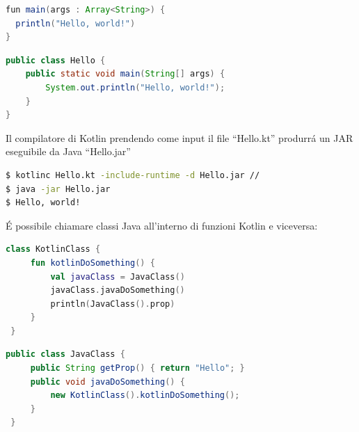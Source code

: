 \begin{lstlisting}[language=java,caption={Hello.kt in Kotlin}]
fun main(args : Array<String>) {
  println("Hello, world!")
}
\end{lstlisting}

\begin{lstlisting}[language=java,caption={Hello.java in Java}]
public class Hello {
    public static void main(String[] args) {
        System.out.println("Hello, world!");
    }
}
\end{lstlisting}

Il compilatore di Kotlin prendendo come input il file ``Hello.kt'' produrr\'a un JAR eseguibile da Java ``Hello.jar''

\begin{lstlisting}[language=bash,caption={Compilatore kotlin}]
$ kotlinc Hello.kt -include-runtime -d Hello.jar //
$ java -jar Hello.jar
$ Hello, world!
\end{lstlisting}

\'E possibile chiamare classi Java all'interno di funzioni Kotlin e viceversa:


\begin{lstlisting}[language=Kotlin,caption={Chiamare Java da Kotlin}]
 class KotlinClass {
     fun kotlinDoSomething() {
         val javaClass = JavaClass()
         javaClass.javaDoSomething()
         println(JavaClass().prop)
     }
 }
 \end{lstlisting}

 \begin{lstlisting}[language=java,caption={Chiamare Kotlin da Java}]
 public class JavaClass {
     public String getProp() { return "Hello"; }
     public void javaDoSomething() {
         new KotlinClass().kotlinDoSomething();
     }
 }
 \end{lstlisting}

